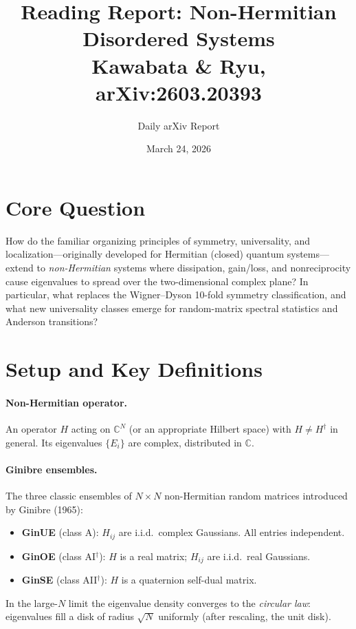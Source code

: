 \documentclass[11pt,a4paper]{article}
\title{Reading Report: Non-Hermitian Disordered Systems\\[4pt]
\large Kawabata \& Ryu, arXiv:2603.20393}
\author{Daily arXiv Report}
\date{March 24, 2026}
\begin{document}
\maketitle

\section{Core Question}
How do the familiar organizing principles of symmetry, universality, and localization---originally developed for Hermitian (closed) quantum systems---extend to \emph{non-Hermitian} systems where dissipation, gain/loss, and nonreciprocity cause eigenvalues to spread over the two-dimensional complex plane?
In particular, what replaces the Wigner--Dyson 10-fold symmetry classification, and what new universality classes emerge for random-matrix spectral statistics and Anderson transitions?

\section{Setup and Key Definitions}

\paragraph{Non-Hermitian operator.}
An operator $H$ acting on $\mathbb{C}^N$ (or an appropriate Hilbert space) with $H \neq H^\dagger$ in general.  Its eigenvalues $\{E_i\}$ are complex, distributed in $\mathbb{C}$.

\paragraph{Ginibre ensembles.}
The three classic ensembles of $N\times N$ non-Hermitian random matrices introduced by Ginibre (1965):
\begin{itemize}[nosep]
  \item \textbf{GinUE} (class A): $H_{ij}$ are i.i.d.\ complex Gaussians.  All entries independent.
  \item \textbf{GinOE} (class AI$^\dagger$): $H$ is a real matrix; $H_{ij}$ are i.i.d.\ real Gaussians.
  \item \textbf{GinSE} (class AII$^\dagger$): $H$ is a quaternion self-dual matrix.
\end{itemize}
In the large-$N$ limit the eigenvalue density converges to the \emph{circular law}: eigenvalues fill a disk of radius $\sqrt{N}$ uniformly (after rescaling, the unit disk).
\end{document}
